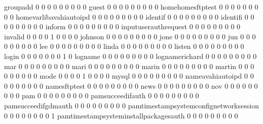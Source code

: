 \documentclass[compress,8pt]{beamer}
\begin{document}
\begin{frame}
\begin{Schunk}
  groupadd                                   0   0   0   0   0   0   0   0   0
  guest                                      0   0   0   0   0   0   0   0   0
  homehomesftptest                           0   0   0   0   0   0   0   0   0
  homevarlibavahiautoipd                     0   0   0   0   0   0   0   0   0
  identif                                    0   0   0   0   0   0   0   0   0
  identifi                                   0   0   0   0   0   0   0   0   0
  inform                                     0   0   0   0   0   0   0   0   0
  inputuserauthrequest                       0   0   0   0   0   0   0   0   0
  invalid                                    0   0   0   0   1   0   0   0   0
  johnson                                    0   0   0   0   0   0   0   0   0
  jone                                       0   0   0   0   0   0   0   0   0
  jun                                        0   0   0   0   0   0   0   0   0
  lee                                        0   0   0   0   0   0   0   0   0
  linda                                      0   0   0   0   0   0   0   0   0
  listen                                     0   0   0   0   0   0   0   0   0
  login                                      0   0   0   0   0   0   0   1   0
  logname                                    0   0   0   0   0   0   0   0   0
  lognamerichard                             0   0   0   0   0   0   0   0   0
  mar                                        0   0   0   0   0   0   0   0   0
  mari                                       0   0   0   0   0   0   0   0   0
  marin                                      0   0   0   0   0   0   0   0   0
  martin                                     0   0   0   0   0   0   0   0   0
  mode                                       0   0   0   0   1   0   0   0   0
  mysql                                      0   0   0   0   0   0   0   0   0
  nameavahiautoipd                           0   0   0   0   0   0   0   0   0
  namesftptest                               0   0   0   0   0   0   0   0   0
  news                                       0   0   0   0   0   0   0   0   0
  nov                                        0   0   0   0   0   0   0   0   0
  pam                                        0   0   0   0   0   0   0   0   0
  pamsucceedifauth                           0   0   0   0   0   0   0   0   0
  pamsucceedifgdmauth                        0   0   0   0   0   0   0   0   0
  pamtimestampsystemconfignetworksession     0   0   0   0   0   0   0   0   1
  pamtimestampsysteminstallpackagesauth      0   0   0   0   0   0   0   0   0

\end{Schunk}
\end{frame}
\end{document}
